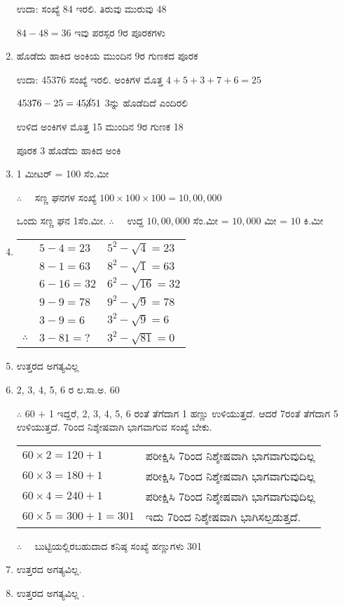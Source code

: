 \begin{enumerate}
ಉದಾ: ಸಂಖ್ಯೆ 84 ಇರಲಿ. ತಿರುವು ಮುರುವು 48 

$84 - 48 = 36$ ಇವು ಪರಸ್ಪರ 9ರ ಪೂರಕಗಳು 

\item ಹೊಡೆದು ಹಾಕಿದ ಅಂಕಿಯ ಮುಂದಿನ 9ರ ಗುಣಕದ ಪೂರಕ 

ಉದಾ: 45376 ಸಂಖ್ಯೆ ಇರಲಿ. ಅಂಕಿಗಳ ಮೊತ್ತ $4 + 5+ 3 + 7 + 6 = 25$

$45376 - 25 = 45\cancel{3}51$ 3ನ್ನು ಹೊಡೆದಿದೆ ಎಂದಿರಲಿ 

ಉಳಿದ ಅಂಕಿಗಳ ಮೊತ್ತ 15 ಮುಂದಿನ 9ರ ಗುಣಕ 18 

ಪೂರಕ 3 ಹೊಡೆದು ಹಾಕಿದ ಅಂಕಿ 

\item 1 ಮೀಟರ್ = 100 ಸೆಂ.ಮೀ

$\therefore\quad$ ಸಣ್ಣ ಘನಗಳ ಸಂಖ್ಯೆ $100\times 100\times 100 = 10,00,000$

ಒಂದು ಸಣ್ಣ ಘನ 1ಸೆಂ.ಮೀ. $\therefore\quad$ ಉದ್ದ $10,00,000$ ಸೆಂ.ಮೀ = $10,000$ ಮೀ = $10$ ಕಿ.ಮೀ 

\item 
\begin{tabular}[t]{lll}
& $5 - 4 = 23$ & $5^{2} - \sqrt{4} = 23$\\
& $8 - 1 = 63$ & $8^{2} - \sqrt{1} = 63$\\
& $6 - 16 = 32$ & $6^{2} - \sqrt{16} = 32$\\
& $9 - 9 = 78$ & $9^{2} - \sqrt{9} = 78$\\
& $3 - 9 = 6$ & $3^{2} - \sqrt{9} = 6$\\
$\therefore$ & $3 - 81 = ?$ & $3^{2} - \sqrt{81} = 0$
\end{tabular}

\item ಉತ್ತರದ ಅಗತ್ಯವಿಲ್ಲ 

\item 2, 3, 4, 5, 6 ರ ಲ.ಸಾ.ಅ. 60

$\therefore$ 60 $+$ 1 ಇದ್ದರೆ, 2, 3, 4, 5, 6 ರಂತೆ ತೆಗೆದಾಗ 1 ಹಣ್ಣು ಉಳಿಯುತ್ತದೆ. ಆದರೆ 7ರಂತೆ ತೆಗೆದಾಗ 5 ಉಳಿಯುತ್ತದೆ. 7ರಿಂದ ನಿಶ್ಶೇಷವಾಗಿ ಭಾಗವಾಗುವ ಸಂಖ್ಯೆ ಬೇಕು.

\begin{tabular}{ll}
$60\times 2 = 120 + 1$ & ಪರೀಕ್ಷಿಸಿ 7ರಿಂದ ನಿಶ್ಶೇಷವಾಗಿ ಭಾಗವಾಗುವುದಿಲ್ಲ\\
$60\times 3 = 180 + 1$ & ಪರೀಕ್ಷಿಸಿ 7ರಿಂದ ನಿಶ್ಶೇಷವಾಗಿ ಭಾಗವಾಗುವುದಿಲ್ಲ\\
$60\times 4 = 240 + 1$ & ಪರೀಕ್ಷಿಸಿ 7ರಿಂದ ನಿಶ್ಶೇಷವಾಗಿ ಭಾಗವಾಗುವುದಿಲ್ಲ\\
$60\times 5 = 300 + 1 = 301$ & ಇದು 7ರಿಂದ ನಿಶ್ಶೇಷವಾಗಿ ಭಾಗಿಸಲ್ಪಡುತ್ತದೆ. 
\end{tabular}

$\therefore\quad$ ಬುಟ್ಟಿಯಲ್ಲಿರಬಹುದಾದ ಕನಿಷ್ಠ ಸಂಖ್ಯೆ ಹಣ್ಣುಗಳು 301

\item ಉತ್ತರದ ಅಗತ್ಯವಿಲ್ಲ.

\item ಉತ್ತರದ ಅಗತ್ಯವಿಲ್ಲ .
\end{enumerate}
